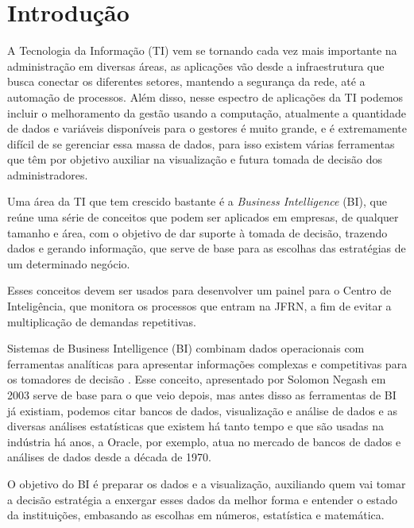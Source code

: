\chapter*{Introdução}

A Tecnologia da Informação (TI) vem se tornando cada vez mais importante na administração em diversas áreas, as aplicações vão desde a infraestrutura que busca conectar os diferentes setores, mantendo a segurança da rede, até a automação de processos. Além disso, nesse espectro de aplicações da TI podemos incluir o melhoramento da gestão usando a computação, atualmente a quantidade de dados e variáveis disponíveis para o gestores é muito grande, e é extremamente difícil de se gerenciar essa massa de dados, para isso existem várias ferramentas que têm por objetivo auxiliar na visualização e futura tomada de decisão dos administradores.

Uma área da TI que tem crescido bastante é a \textit{Business Intelligence} (BI), que reúne uma série de conceitos que podem ser aplicados em empresas, de qualquer tamanho e área, com o objetivo de dar suporte à tomada de decisão, trazendo dados e gerando informação, que serve de base para as escolhas das estratégias de um determinado negócio.

Esses conceitos devem ser usados para desenvolver um painel para o Centro de Inteligência, que monitora os processos que entram na JFRN, a fim de evitar a multiplicação de demandas repetitivas.

Sistemas de Business Intelligence (BI) combinam dados operacionais com ferramentas analíticas para apresentar informações complexas e competitivas para os tomadores de decisão \cite{negash1}. Esse conceito, apresentado por Solomon Negash em 2003 serve de base para o que veio depois, mas antes disso as ferramentas de BI já existiam, podemos citar bancos de dados, visualização e análise de dados e as diversas análises estatísticas que existem há tanto tempo e que são usadas na indústria há anos, a Oracle, por exemplo, atua no mercado de bancos de dados e análises de dados desde a década de 1970. 

O objetivo do BI é preparar os dados e a visualização, auxiliando quem vai tomar a decisão estratégia a enxergar esses dados da melhor forma e entender o estado da instituições, embasando as escolhas em números, estatística e matemática. 

